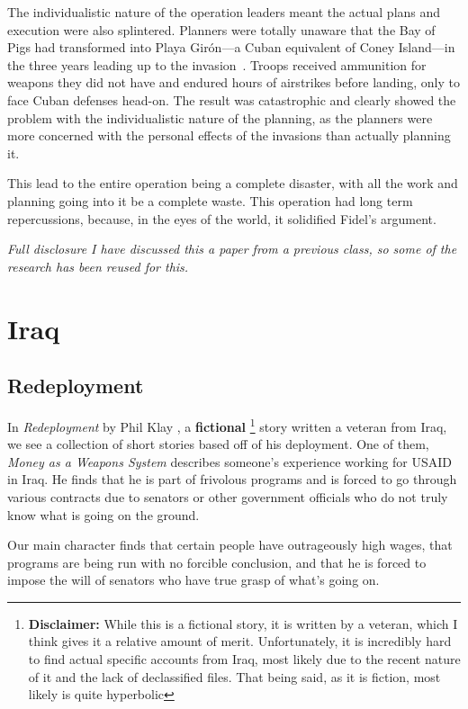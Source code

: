 \documentclass{article}
\begin{document}
    The individualistic nature of the operation leaders meant the actual plans and execution were also splintered. Planners were totally unaware that the Bay of Pigs had transformed into Playa Girón—a Cuban equivalent of Coney Island—in the three years leading up to the invasion~\parencite{Wyden1979}. Troops received ammunition for weapons they did not have and endured hours of airstrikes before landing, only to face Cuban defenses head-on. The result was catastrophic and clearly showed the problem with the individualistic nature of the planning, as the planners were more concerned with the personal effects of the invasions than actually planning it. 

    This lead to the entire operation being a complete disaster, with all the work and planning going into it be a complete waste. This operation had long term repercussions, because, in the eyes of the world, it solidified Fidel's argument.

    \textit{Full disclosure I have discussed this a paper from a previous class, so some of the research has been reused for this.}

\section{Iraq}

    \subsection{Redeployment}
        In \textit{Redeployment} by Phil Klay \parencite{Klay2014}, a \textbf{fictional}
        \footnote{\textbf{Disclaimer:} While this is a fictional story, it is written by a veteran, which I think gives it a relative amount of merit. Unfortunately, it is incredibly hard to find actual specific accounts from Iraq, most likely due to the recent nature of it and the lack of declassified files. That being said, as it is fiction, most likely is quite hyperbolic} 
        story written a veteran from Iraq, we see a collection of short stories based off of his deployment. One of them, \textit{Money as a Weapons System} describes someone's experience working for USAID in Iraq. He finds that he is part of frivolous programs and is forced to  go through various contracts due to senators or other government officials who do not truly know what is going on the ground. 

        Our main character finds that certain people have outrageously high wages, that programs are being run with no forcible conclusion, and that he is forced to impose the will of senators who have true grasp of what's going on. 
\end{document}
